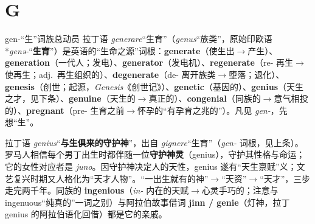 \documentclass[../main.tex]{subfiles}
\begin{document}
\section{G}



\begin{gram}{gen-“生”词族总动员}
拉丁语 \textit{generare}“生育”（\textit{genus}“族类”，原始印欧语 *\textit{genə-}“\textbf{生育}”）是英语的“生命之源”词根：\textbf{generate}（使生出$\to$产生）、\textbf{generation}（一代人；发电）、\textbf{generator}（发电机）、\textbf{regenerate}（re- 再生$\to$使再生；adj.\ 再生组织的）、\textbf{degenerate}（de- 离开族类$\to$堕落；退化）、\textbf{genesis}（创世；起源，\textit{Genesis}《创世记》）、\textbf{genetic}（基因的）、\textbf{genius}（天生之才，见下条）、\textbf{genuine}（天生的$\to$真正的）、\textbf{congenial}（同族的$\to$意气相投的）、\textbf{pregnant}（pre- 生育之前$\to$怀孕的“有孕育之兆的”）。凡见 \textit{gen-}，先想“生”。
\end{gram}




\begin{origin}
拉丁语 \textit{genius}“\textbf{与生俱来的守护神}”，出自 \textit{gignere}“生育”（\textit{gen-} 词根，见上条）。罗马人相信每个男丁出生时都伴随一位\textbf{守护神灵}（genius），守护其性格与命运；它的女性对应者是 \textit{juno}。因守护神决定人的天性，genius 遂有“天生禀赋”义；文艺复兴时期又人格化为“天才人物”。“一出生就有的神”$\to$“天资”$\to$“天才”，三步走完两千年。同族的 \textbf{ingenious}（\textit{in-} 内在的天赋$\to$心灵手巧的；注意与 ingenuous“纯真的”一词之别）与阿拉伯故事借词 \textbf{jinn / genie}（灯神，拉丁 genius 的阿拉伯语化回借）都是它的亲戚。
\end{origin}
\end{document}
